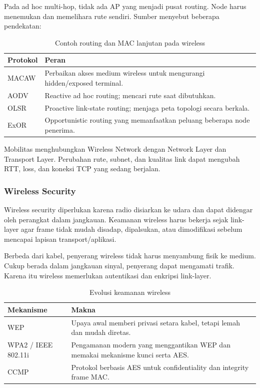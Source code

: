 Pada ad hoc multi-hop, tidak ada AP yang menjadi pusat routing. Node harus menemukan dan memelihara rute sendiri. Sumber menyebut beberapa pendekatan:
\begin{table}[H]
\centering
\begin{tabularx}{\textwidth}{|L{0.22\textwidth}|X|}
\hline
\textbf{Protokol} & \textbf{Peran} \\
\hline
MACAW & Perbaikan akses medium wireless untuk mengurangi hidden/exposed terminal. \\
\hline
AODV & Reactive ad hoc routing; mencari rute saat dibutuhkan. \\
\hline
OLSR & Proactive link-state routing; menjaga peta topologi secara berkala. \\
\hline
ExOR & Opportunistic routing yang memanfaatkan peluang beberapa node penerima. \\
\hline
\end{tabularx}
\caption{Contoh routing dan MAC lanjutan pada wireless}
\label{tab:wireless-routing}
\end{table}

Mobilitas menghubungkan Wireless Network dengan Network Layer dan Transport Layer. Perubahan rute, subnet, dan kualitas link dapat mengubah RTT, loss, dan koneksi TCP yang sedang berjalan.

\subsubsection{Wireless Security}
\begin{jawab}
Wireless security diperlukan karena radio disiarkan ke udara dan dapat didengar oleh perangkat dalam jangkauan. Keamanan wireless harus bekerja sejak link-layer agar frame tidak mudah disadap, dipalsukan, atau dimodifikasi sebelum mencapai lapisan transport/aplikasi.
\end{jawab}

Berbeda dari kabel, penyerang wireless tidak harus menyambung fisik ke medium. Cukup berada dalam jangkauan sinyal, penyerang dapat mengamati trafik. Karena itu wireless memerlukan autentikasi dan enkripsi link-layer.

\begin{table}[H]
\centering
\begin{tabularx}{\textwidth}{|L{0.25\textwidth}|X|}
\hline
\textbf{Mekanisme} & \textbf{Makna} \\
\hline
WEP & Upaya awal memberi privasi setara kabel, tetapi lemah dan mudah diretas. \\
\hline
WPA2 / IEEE 802.11i & Pengamanan modern yang menggantikan WEP dan memakai mekanisme kunci serta AES. \\
\hline
CCMP & Protokol berbasis AES untuk confidentiality dan integrity frame MAC. \\
\hline
\end{tabularx}
\caption{Evolusi keamanan wireless}
\label{tab:wireless-security}
\end{table}


